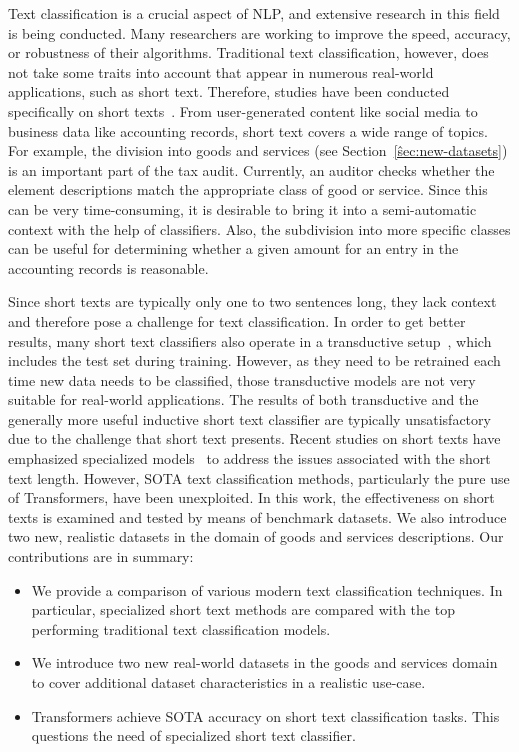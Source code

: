 \documentclass[runningheads]{llncs}
\begin{document}
Text classification is a crucial aspect of \ac{NLP}, and extensive research in this field is being conducted. Many researchers are working to improve the speed, accuracy, or robustness of their algorithms.
Traditional text classification, however, does not take some traits into account that appear in numerous real-world applications, such as short text.
Therefore, studies have been conducted specifically on short texts~\cite{shine,zhao2021sequential}. 
From user-generated content like social media to business data like accounting records, short text covers a wide range of topics.
For example, the division into goods and services (see Section~\ref{ŝec:new-datasets}) is an important part of the tax audit. 
Currently, an auditor checks whether the element descriptions match the appropriate class of good or service. 
Since this can be very time-consuming, it is desirable to bring it into a semi-automatic context with the help of classifiers. 
Also, the subdivision into more specific classes can be useful for determining whether a given amount for an entry in the accounting records is reasonable.

Since short texts are typically only one to two sentences long, they lack context and therefore pose a challenge for text classification.
In order to get better results, many short text classifiers also operate in a transductive setup~\cite{hgat,shine,ye2020document}, which includes the test set during training. 
However, as they need to be retrained each time new data needs to be classified, those transductive models are not very suitable for real-world applications.
The results of both transductive and the generally more useful inductive short text classifier are typically unsatisfactory due to the challenge that short text presents.
Recent studies on short texts have emphasized specialized models~\cite{hgat,nc-hgat,zhao2021sequential,wang2021short,shine,ye2020document} to address the issues associated with the short text length.
However, \acf{SOTA} text classification methods, particularly the pure use of Transformers, have been unexploited.
In this work, the effectiveness on short texts is examined and tested by means of benchmark datasets.
We also introduce two new, realistic datasets in the domain of goods and services descriptions.
Our contributions are in summary:
\begin{itemize}
    \item We provide a comparison of various modern text classification techniques.
    In particular, specialized short text methods are compared with the top performing traditional text classification models.
    
    \item We introduce two new real-world datasets in the goods and services domain to cover additional dataset characteristics in a realistic use-case.

    \item Transformers achieve SOTA accuracy on short text classification tasks. 
    This questions the need of specialized short text classifier.
\end{itemize}
\end{document}
